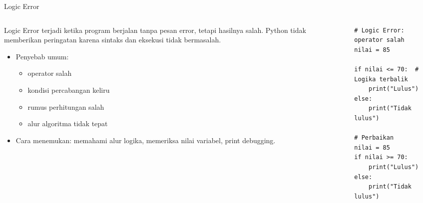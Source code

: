 \documentclass[aspectratio=169, table]{beamer}
\begin{document}
\begin{frame}[fragile]{Logic Error}
\vspace{20pt}

\begin{columns}[T]
    \begin{column}{0.5\linewidth}
        Logic Error terjadi ketika program berjalan tanpa pesan error, tetapi hasilnya salah.  
        Python tidak memberikan peringatan karena sintaks dan eksekusi tidak bermasalah.

        \begin{itemize}
            \item Penyebab umum:
            \begin{itemize}
                \item operator salah
                \item kondisi percabangan keliru
                \item rumus perhitungan salah
                \item alur algoritma tidak tepat
            \end{itemize}
            \item Cara menemukan: memahami alur logika, memeriksa nilai variabel, print debugging.
        \end{itemize}
    \end{column}

    \begin{column}{0.45\linewidth}
\begin{lstlisting}[style=PythonStyle, basicstyle=\ttfamily\scriptsize]
# Logic Error: operator salah
nilai = 85

if nilai <= 70:  # Logika terbalik
    print("Lulus")
else:
    print("Tidak lulus")

# Perbaikan
nilai = 85
if nilai >= 70:
    print("Lulus")
else:
    print("Tidak lulus")
\end{lstlisting}
    \end{column}
\end{columns}

\end{frame}

\end{document}

